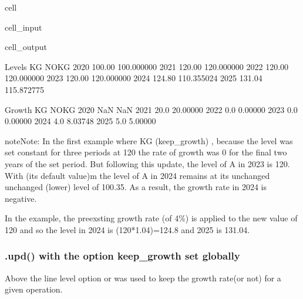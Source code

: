 \documentclass[letterpaper,10pt,english]{jupyterBook}
\begin{document}
\begin{sphinxuseclass}{cell}
\begin{sphinxVerbatimInput}
\begin{sphinxuseclass}{cell_input}
\end{sphinxuseclass}\end{sphinxVerbatimInput}
\begin{sphinxVerbatimOutput}

\begin{sphinxuseclass}{cell_output}
\begin{sphinxVerbatim}[commandchars=\\\{\}]
Levels
          KG        NOKG
2020  100.00  100.000000
2021  120.00  120.000000
2022  120.00  120.000000
2023  120.00  120.000000
2024  124.80  110.355024
2025  131.04  115.872775

Growth
        KG      NOKG
2020   NaN       NaN
2021  20.0  20.00000
2022   0.0   0.00000
2023   0.0   0.00000
2024   4.0  \PYGZhy{}8.03748
2025   5.0   5.00000
\end{sphinxVerbatim}

\begin{sphinxVerbatim}[commandchars=\\\{\}]

\end{sphinxVerbatim}

\end{sphinxuseclass}\end{sphinxVerbatimOutput}

\end{sphinxuseclass}
\begin{sphinxadmonition}{note}{Note:}
\sphinxAtStartPar
In the first example where KG (keep\_growth) , because the level was set constant for three periods at 120 the rate of growth was 0 for the final two years of the set period.  But following this update, the level of A in 2023 is 120. With  (its default value)m the level of A in 2024 remains at its unchanged  unchanged (lower) level of 100.35. As a result, the growth rate in 2024 is negative.

\sphinxAtStartPar
In the  example, the pre\sphinxhyphen{}exsting growth rate (of 4\%) is applied to the new value of 120 and so the level in 2024 is (120*1.04)=124.8 and 2025 is 131.04.
\end{sphinxadmonition}


\subsubsection{.upd() with the option keep\_growth set globally}
\label{\detokenize{content/04_PythonEssentials/UpdateCommand:upd-with-the-option-keep-growth-set-globally}}
\sphinxAtStartPar
Above the line level option  or  was used to keep the growth rate(or not) for a given operation.
\end{document}
